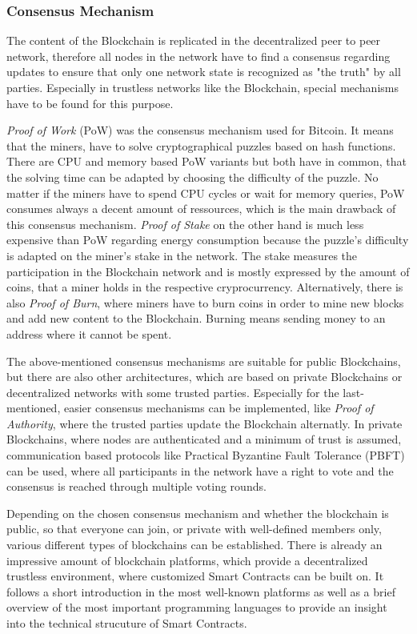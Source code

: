 \documentclass[conference]{IEEEtran}
\begin{document}
\subsubsection{Consensus Mechanism}
The content of the Blockchain is replicated in the decentralized peer to peer network, therefore all nodes in the network have to find a consensus regarding updates to ensure that only one network state is recognized as "the truth" by all parties. Especially in trustless networks like the Blockchain, special mechanisms have to be found for this purpose. \cite{Dinh?}\par 
\textit{Proof of Work} (PoW) was the consensus mechanism used for Bitcoin. It means that the miners, have to solve cryptographical puzzles based on hash functions. There are CPU and memory based PoW variants but both have in common, that the solving time can be adapted by choosing the difficulty of the puzzle. No matter if the miners have to spend CPU cycles or wait for memory queries, PoW consumes always a decent amount of ressources, which is the main drawback of this consensus mechanism. \cite{Dinh?} \cite{Golze2009}
\textit{Proof of Stake} on the other hand is much less expensive than PoW regarding energy consumption because the puzzle's difficulty is adapted on the miner's stake in the network. The stake measures the participation in the Blockchain network and is mostly expressed by the amount of coins, that a miner holds in the respective cryprocurrency. Alternatively, there is also \textit{Proof of Burn}, where miners have to burn coins in order to mine new blocks and add new content to the Blockchain. Burning means sending money to an address where it cannot be spent. \cite{Dinh?} \par
The above-mentioned consensus mechanisms are suitable for public Blockchains, but there are also other architectures, which are based on private Blockchains or decentralized networks with some trusted parties. Especially for the last-mentioned, easier consensus mechanisms can be implemented, like \textit{Proof of Authority}, where the trusted parties update the Blockchain alternatly. In private Blockchains, where nodes are authenticated and a minimum of trust is assumed, communication based protocols like Practical Byzantine Fault Tolerance (PBFT) can be used, where all participants in the network have a right to vote and the consensus is reached through multiple voting rounds. \cite{Dinh?} \par 
Depending on the chosen consensus mechanism and whether the blockchain is public, so that everyone can join, or private with well-defined members only, various different types of blockchains can be established. There is already an impressive amount of blockchain platforms, which provide a decentralized trustless environment, where customized Smart Contracts can be built on. It follows a short introduction in the most well-known platforms as well as a brief overview of the most important programming languages to provide an insight into the technical strucuture of Smart Contracts. 
\end{document}
